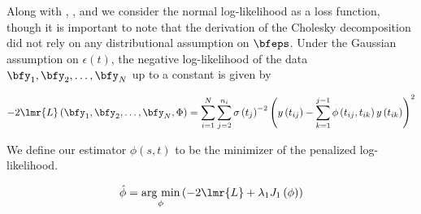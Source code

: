 Along with \citet{huang2006covariance}, \citet{levina2008sparse}, and \citet{pourahmadi2000maximum} we consider the normal log-likelihood as a loss function, though it is important to note that the derivation of the Cholesky decomposition did not rely on any distributional assumption on $\bfeps$. Under the Gaussian assumption on $\epsilon\left(t\right)$, the negative log-likelihood of the data $\bfy_1,\bfy_2,\dots, \bfy_N$ up to a constant is given by

\begin{equation}
-2\lmr{L}\left(\bfy_1, \bfy_2, \dots,\bfy_N ,\Phi \right) = \sum_{i=1}^N \sum_{j=2}^{n_i} \sigma\left({t_j}\right)^{-2} \left(y\left({t_{ij}}\right) - \sum_{k=1}^{j-1}\phi\left({t_{ij},t_{ik}}\right)y\left({t_{ik}}\right) \right)^2 \label{loglikelihood}
\end{equation}




 We define our estimator $\hat{\phi}\left(s,t\right)$ to be the minimizer of the penalized log-likelihood. %


\begin{equation} 
\hat{\phi} = \mathop{\mbox{arg min}}_{\phi} \left( -2\lmr{L} + \lambda_1 J_1\left(\phi\right) \right) \label{stage1obj}
\end{equation}
\noindent


